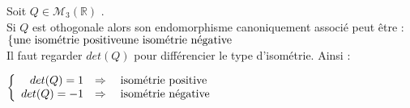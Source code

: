 \begin{enumerate}
\begin{enumerate}
                    Soit $Q\in \mathcal{M}_3(\mathbb{R})$ .\\
                    Si $Q$ est othogonale alors son endomorphisme canoniquement associé peut être :\\
                    $
                        \left\{
                        \text{une isométrie positive}\\
                        \text{une isométrie négative}\\
                        \right.
                    $\\
                    Il faut regarder $det(Q)$ pour différencier le type d'isométrie. Ainsi :

                    \begin{result}
                        $
                            \left\{
                            \begin{array}{r c l}
                                det(Q) = 1  & \Rightarrow{} & \text{isométrie positive} \\
                                det(Q) = -1 & \Rightarrow{} & \text{isométrie négative} \\
                            \end{array}
                            \right.
                        $
                    \end{result}
          \end{enumerate}
\end{enumerate}{}
